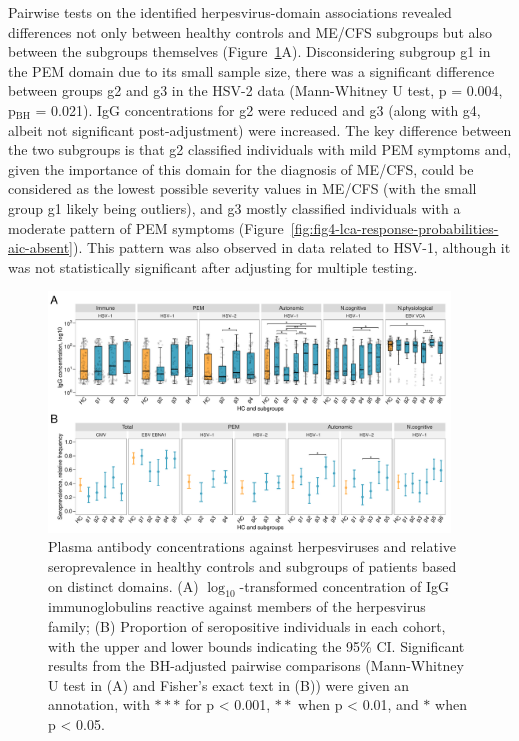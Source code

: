 Pairwise tests on the identified herpesvirus-domain associations revealed differences not only between healthy controls and ME/CFS subgroups but also between the subgroups themselves (Figure~\ref{fig:fig6-aic-sero-and-seropos-adj-signif-v2}A).
Disconsidering subgroup g1 in the PEM domain due to its small sample size, there was a significant difference between groups g2 and g3 in the HSV-2 data (Mann-Whitney U test, p = 0.004, p$_{\text{BH}}$ = 0.021).
IgG concentrations for g2 were reduced and g3 (along with g4, albeit not significant post-adjustment) were increased.
The key difference between the two subgroups is that g2 classified individuals with mild PEM symptoms and, given the importance of this domain for the diagnosis of ME/CFS, could be considered as the lowest possible severity values in ME/CFS (with the small group g1 likely being outliers), and g3 mostly classified individuals with a moderate pattern of PEM symptoms (Figure~\ref{fig:fig4-lca-response-probabilities-aic-absent}).
This pattern was also observed in data related to HSV-1, although it was not statistically significant after adjusting for multiple testing.

\begin{figure}[h]
    \centering
    \includegraphics[width=0.95\textwidth]{chapter/2024-sym-domains/figures/fig6-aic-sero-and-seropos-adj-signif-v2.pdf}
    \caption[Plasma antibody concentrations against herpesviruses and relative seroprevalence in healthy controls and subgroups of \cfs patients based on distinct domains]{Plasma antibody concentrations against herpesviruses and relative seroprevalence in healthy controls and subgroups of \cfs patients based on distinct domains. (A) ${\log_{10}}$-transformed concentration of IgG immunoglobulins reactive against members of the herpesvirus family; (B) Proportion of seropositive individuals in each cohort, with the upper and lower bounds indicating the 95\% CI. Significant results from the BH-adjusted pairwise comparisons (Mann-Whitney U test in (A) and Fisher’s exact text in (B)) were given an annotation, with $\ast\ast\ast$ for p < 0.001, $\ast\ast$ when p < 0.01, and $\ast$ when p < 0.05.}
    \label{fig:fig6-aic-sero-and-seropos-adj-signif-v2}
\end{figure}

